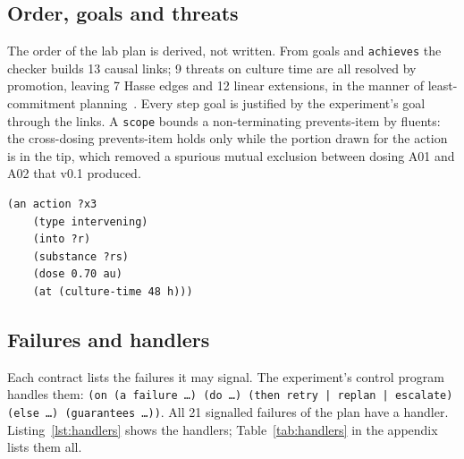 \documentclass[10pt,a4paper]{article}
\begin{document}
\subsection{Order, goals and threats}\label{sec:order}

The order of the lab plan is derived, not written. From goals and \texttt{achieves} the checker builds 13 causal links; 9 threats on culture time are all resolved by promotion, leaving 7 Hasse edges and 12 linear extensions, in the manner of least-commitment planning~\citep{weld1994}. Every step goal is justified by the experiment's goal through the links. A \texttt{scope} bounds a non-terminating prevents-item by fluents: the cross-dosing prevents-item holds only while the portion drawn for the action is in the tip, which removed a spurious mutual exclusion between dosing A01 and A02 that v0.1 produced.

\begin{listing}[tbp]
\begin{Verbatim}[fontsize=\footnotesize,breaklines,frame=lines,framesep=2mm]
(an action ?x3
    (type intervening)
    (into ?r)
    (substance ?rs)
    (dose 0.70 au)
    (at (culture-time 48 h)))
\end{Verbatim}
\caption{A lab action designator of the generated plan (the rescue dose).}\label{lst:lab}
\end{listing}

\subsection{Failures and handlers}\label{sec:handlers}

Each contract lists the failures it may signal. The experiment's control program handles them: \texttt{(on (a failure …) (do …) (then retry | replan | escalate) (else …) (guarantees …))}. All 21 signalled failures of the plan have a handler. Listing~\ref{lst:handlers} shows the handlers; Table~\ref{tab:handlers} in the appendix lists them all.
\end{document}
